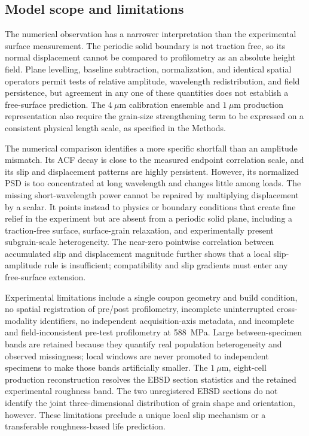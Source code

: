 \documentclass[final,12pt]{cas-sc}
\begin{document}
\subsection{Model scope and limitations}

The numerical observation has a narrower interpretation than the experimental
surface measurement. The periodic solid boundary is not traction free, so its
normal displacement cannot be compared to profilometry as an absolute height
field. Plane levelling, baseline subtraction, normalization, and identical
spatial operators permit tests of relative amplitude, wavelength
redistribution, and field persistence, but agreement in any one of these
quantities does not establish a free-surface prediction. The $4~\mu$m
calibration ensemble and $1~\mu$m production representation also require the
grain-size strengthening term to be expressed on a consistent physical length
scale, as specified in the Methods.

The numerical comparison identifies a more specific shortfall than an
amplitude mismatch. Its ACF decay is close to the measured endpoint
correlation scale, and its slip and displacement patterns are highly
persistent. However, its normalized PSD is too concentrated at long
wavelength and changes little among loads. The missing short-wavelength power
cannot be repaired by multiplying displacement by a scalar. It points instead
to physics or boundary conditions that create fine relief in the experiment
but are absent from a periodic solid plane, including a traction-free surface,
surface-grain relaxation, and experimentally present subgrain-scale
heterogeneity. The near-zero pointwise correlation between accumulated slip
and displacement magnitude further shows that a local slip-amplitude rule is
insufficient; compatibility and slip gradients must enter any free-surface
extension.

Experimental limitations include a single coupon geometry and build condition,
no spatial registration of pre/post profilometry, incomplete uninterrupted
cross-modality identifiers, no independent acquisition-axis metadata, and
incomplete and field-inconsistent pre-test profilometry at 588~MPa. Large
between-specimen bands are retained because they quantify real population
heterogeneity and observed missingness; local windows are never promoted to
independent specimens to make those bands artificially smaller. The
$1~\mu$m, eight-cell production reconstruction resolves the EBSD section
statistics and the retained experimental roughness band. The two unregistered
EBSD sections do not identify the joint three-dimensional distribution of
grain shape and orientation, however. These limitations preclude a unique
local slip mechanism or a transferable roughness-based life prediction.
\end{document}
